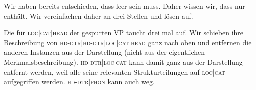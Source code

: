 \documentclass[10pt,a3paper]{article}
\newcommand{\rot}[1]{\textcolor{rot}{#1}}
\newcommand{\gruen}[1]{\textcolor{gruen}{#1}}
\newcommand{\tuerkis}[1]{\textcolor{tuerkis}{#1}}
\newcommand{\braun}[1]{\textcolor{braun}{#1}}
\newcommand*{\mybox}[1]{\framebox{#1}}
\newcommand{\Sub}[1]{\ensuremath{_{\text{#1}}}}
\newcommand{\Zeile}{\vspace{\baselineskip}}
\begin{document}
\Zeile

Wir haben bereits entschieden, dass \mybox{103} leer sein muss.
Daher wissen wir, dass \mybox{102} nur \mybox{104} enthält.
Wir vereinfachen daher an drei Stellen und lösen \mybox{103} auf.

\Zeile


\Zeile

Die \mybox{105} für \textsc{loc|cat|head} der gespurten VP taucht drei mal auf.
Wir schieben ihre Beschreibung von \textsc{hd-dtr|hd-dtr|loc|cat|head} ganz nach oben und entfernen die anderen Instanzen aus der Darstellung (nicht aus der eigentlichen Merkmalsbeschreibung).
\textsc{hd-dtr|loc|cat} kann damit ganz aus der Darstellung entfernt werden, weil alle seine relevanten Strukturteilungen auf \textsc{loc|cat} aufgegriffen werden.
\textsc{hd-dtr|phon} kann auch weg.

\Zeile

\end{document}
